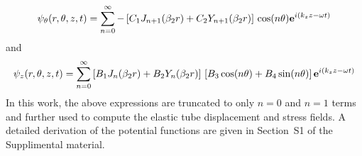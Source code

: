 \documentclass[11pt,cleanfoot]{asme2ej}
\begin{document}
\begin{equation}\label{Vector potential equation theta}
    \psi_{\theta}(r,\theta,z,t) = \sum_{n=0}^{\infty}-\left[C_{1}J_{n+1}(\beta_2 r) + C_{2}Y_{n+1}(\beta_2 r)\right]\\\cos(n\theta)\mathbf{e}^{i(k_{z}z-\omega t)}
\end{equation}
and
\begin{equation}\label{Vector potential equation z}
    \psi_{z}(r,\theta,z,t) = \sum_{n=0}^{\infty}\left[B_{1}J_{n}(\beta_2 r) + B_{2}Y_{n}(\beta_2 r)\right]\\ \left[B_{3}\cos(n\theta) + B_{4}\sin(n\theta)\right]\mathbf{e}^{i(k_{z}z-\omega t)}
\end{equation}
In this work, the above expressions are truncated to only $n=0$ and $n=1$ terms and further used to compute the elastic tube displacement and stress fields. A detailed derivation of the potential functions are given in Section~S1 of the Supplimental material.
\allowdisplaybreaks
\end{document}
